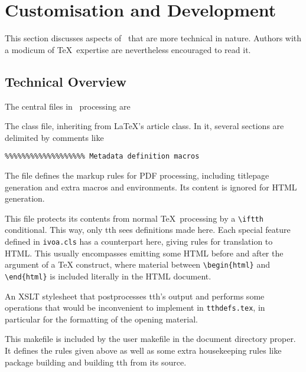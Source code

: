 \documentclass[11pt,a4paper]{ivoa}
\begin{document}
\section{Customisation and Development}
\label{sect:impl}

This section discusses aspects of \ivoatex\ that are more technical in
nature.  Authors with a modicum of \TeX\ expertise are nevertheless
encouraged to read it.

\subsection{Technical Overview}

The central files in \ivoatex\ processing are

\begin{bigdescription}
\item[ivoa.cls] The class file, inheriting from \LaTeX's article class.
In it, several sections are delimited by comments like

\begin{lstlisting}
%%%%%%%%%%%%%%%%%%% Metadata definition macros
\end{lstlisting}

The file defines the markup rules for PDF processing, including
titlepage generation and extra macros and environments.  Its content is
ignored for HTML generation.

\item[tthdefs.tex] This file protects its contents from normal \TeX\
processing by a \verb|\iftth| conditional. This way, only tth sees
definitions made here. Each special feature defined in \texttt{ivoa.cls}
has a counterpart here, giving rules for translation to HTML.  This
usually encompasses emitting some HTML before and after the argument of
a TeX construct, where material between \verb|\begin{html}| and
\verb|\end{html}| is included literally in the HTML document.

\item[tth-ivoa.xslt] An XSLT stylesheet that postprocesses tth's output
and performs some operations that would be inconvenient to implement in
\texttt{tthdefs.tex}, in particular for the formatting of the opening
material.

\item[Makefile] This makefile is included by the user makefile in the
document directory proper.  It defines the rules given above as well as
some extra housekeeping rules like package building and building tth
from its source.

\end{bigdescription}
\end{document}
